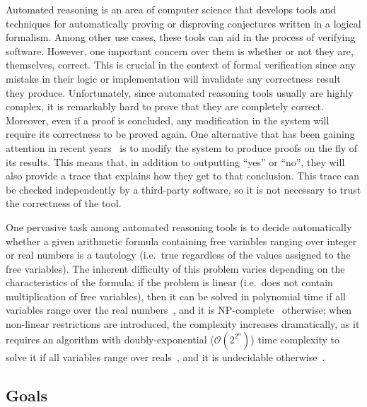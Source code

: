 \documentclass[a4paper, 12pt]{article}
\begin{document}
Automated reasoning is an area of computer science that develops tools and techniques for automatically
proving or disproving conjectures written in a logical formalism. Among other use cases, these tools can
aid in the process of verifying software. However,
one important concern over them is whether or not they are, themselves, correct. This is crucial
in the context of formal verification since any mistake in their logic or implementation will invalidate any
correctness result they produce. Unfortunately, since automated reasoning tools usually are highly complex,
it is remarkably hard to prove that they are completely correct. Moreover, even if a proof is concluded,
any modification in the system will require its correctness to be proved again. One alternative that has been
gaining attention in recent years~\cite{generatingProofs, proofsInSmt} is to modify the system to produce
proofs on the fly of its results. This means that, in addition to outputting ``yes'' or ``no'', they will
also provide a trace that explains how they get to that conclusion. This trace can be checked independently
by a third-party software, so it is not necessary to trust the correctness of the tool.
%


One pervasive task among automated reasoning tools is to decide
automatically whether a given arithmetic formula containing free variables ranging over integer or
real numbers is a tautology (i.e.\ true regardless of the values assigned to the free variables).
The inherent difficulty of this problem varies depending on the characteristics of the formula:
if the problem is linear (i.e.\ does not contain multiplication of free variables), then
it can be solved in polynomial time if all variables range over the real numbers~\cite{Kha79}, and it
is NP-complete~\cite{Kar72} otherwise; when non-linear restrictions are introduced, the complexity increases
dramatically, as it requires an algorithm with doubly-exponential ($\mathcal{O}(2^{2^{n}})$) time complexity
to solve it if all variables range over reals~\cite{computerAlgebraBook},
and it is undecidable otherwise~\cite{integerUndec}.





\subsection{Goals}
\end{document}
